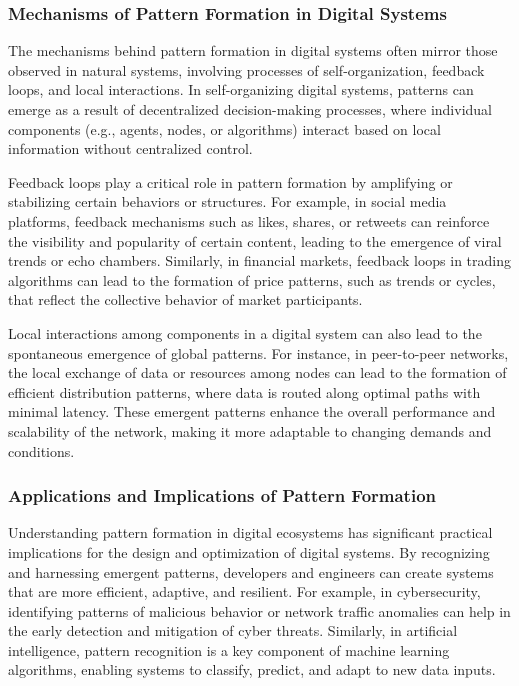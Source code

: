 \documentclass[12pt,twoside]{article}
\begin{document}
\subsubsection{Mechanisms of Pattern Formation in Digital Systems}

The mechanisms behind pattern formation in digital systems often mirror those observed in natural systems, involving processes of self-organization, feedback loops, and local interactions. In self-organizing digital systems, patterns can emerge as a result of decentralized decision-making processes, where individual components (e.g., agents, nodes, or algorithms) interact based on local information without centralized control.

Feedback loops play a critical role in pattern formation by amplifying or stabilizing certain behaviors or structures. For example, in social media platforms, feedback mechanisms such as likes, shares, or retweets can reinforce the visibility and popularity of certain content, leading to the emergence of viral trends or echo chambers. Similarly, in financial markets, feedback loops in trading algorithms can lead to the formation of price patterns, such as trends or cycles, that reflect the collective behavior of market participants.

Local interactions among components in a digital system can also lead to the spontaneous emergence of global patterns. For instance, in peer-to-peer networks, the local exchange of data or resources among nodes can lead to the formation of efficient distribution patterns, where data is routed along optimal paths with minimal latency. These emergent patterns enhance the overall performance and scalability of the network, making it more adaptable to changing demands and conditions.

\subsubsection{Applications and Implications of Pattern Formation}

Understanding pattern formation in digital ecosystems has significant practical implications for the design and optimization of digital systems. By recognizing and harnessing emergent patterns, developers and engineers can create systems that are more efficient, adaptive, and resilient. For example, in cybersecurity, identifying patterns of malicious behavior or network traffic anomalies can help in the early detection and mitigation of cyber threats. Similarly, in artificial intelligence, pattern recognition is a key component of machine learning algorithms, enabling systems to classify, predict, and adapt to new data inputs.
\end{document}
